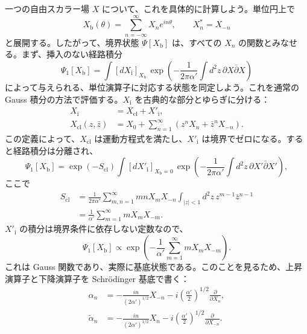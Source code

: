 一つの自由スカラー場 $X$ について、これを具体的に計算しよう。単位円上で
\begin{equation}
X_{\mathrm b}(\theta)=\sum_{n=-\infty}^\infty X_ne^{in\theta},
\qquad X_n^*=X_{-n}
\tag{2.8.19}\label{eq:2.8.19}
\end{equation}
と展開する。したがって、境界状態 $\Psi[X_{\mathrm b}]$ は、すべての $X_n$ の関数とみなせる。まず、挿入のない経路積分
\begin{equation}
\Psi_1[X_{\mathrm b}]
=\int[dX_{\mathrm i}]_{X_{\mathrm b}}\,
\exp\left(-\frac1{2\pi\alpha'}
\int d^2z\,\partial X\bar\partial X\right)
\tag{2.8.20}\label{eq:2.8.20}
\end{equation}
によって与えられる、単位演算子に対応する状態を同定しよう。これを通常の Gauss 積分の方法で評価する。$X_{\mathrm i}$ を古典的な部分とゆらぎに分ける：
\begin{align}
X_{\mathrm i}&=X_{\mathrm{cl}}+X'_{\mathrm i},
\tag{2.8.21a}\label{eq:2.8.21a}\\
X_{\mathrm{cl}}(z,\bar z)
&=X_0+\sum_{n=1}^\infty(z^nX_n+\bar z^nX_{-n}).
\tag{2.8.21b}\label{eq:2.8.21b}
\end{align}
この定義によって、$X_{\mathrm{cl}}$ は運動方程式を満たし、$X'_{\mathrm i}$ は境界でゼロになる。すると経路積分は分離され、
\begin{equation}
\Psi_1[X_{\mathrm b}]=\exp(-S_{\mathrm{cl}})
\int[dX'_{\mathrm i}]_{X_{\mathrm b}=0}\,
\exp\left(-\frac1{2\pi\alpha'}
\int d^2z\,\partial X'\bar\partial X'\right),
\tag{2.8.22}\label{eq:2.8.22}
\end{equation}
ここで
\begin{equation}
\begin{aligned}
S_{\mathrm{cl}}&=\frac1{2\pi\alpha'}
\sum_{m,n=1}^\infty mnX_mX_{-n}
\int_{|z|<1}d^2z\,z^{m-1}\bar z^{n-1}\\
&=\frac1{\alpha'}\sum_{m=1}^\infty mX_mX_{-m}.
\end{aligned}
\tag{2.8.23}\label{eq:2.8.23}
\end{equation}
$X'_{\mathrm i}$ の積分は境界条件に依存しない定数なので、
\begin{equation}
\Psi_1[X_{\mathrm b}]\propto
\exp\left(-\frac1{\alpha'}\sum_{m=1}^\infty mX_mX_{-m}\right).
\tag{2.8.24}\label{eq:2.8.24}
\end{equation}
これは Gauss 関数であり、実際に基底状態である。このことを見るため、上昇演算子と下降演算子を Schrödinger 基底で書く：
\begin{align}
\alpha_n&=-\frac{in}{(2\alpha')^{1/2}}X_{-n}
-i\left(\frac{\alpha'}2\right)^{1/2}\frac{\partial}{\partial X_n},
\tag{2.8.25a}\label{eq:2.8.25a}\\
\widetilde\alpha_n&=-\frac{in}{(2\alpha')^{1/2}}X_n
-i\left(\frac{\alpha'}2\right)^{1/2}\frac{\partial}{\partial X_{-n}}.
\tag{2.8.25b}\label{eq:2.8.25b}
\end{align}
